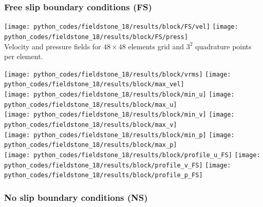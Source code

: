 \subsubsection*{Free slip boundary conditions (FS)}

\begin{center}
\texttt{[image: python\_codes/fieldstone\_18/results/block/FS/vel]}
\texttt{[image: python\_codes/fieldstone\_18/results/block/FS/press]}\\
{\captionfont Velocity and pressure fields for $48\times 48$ elements grid and $3^2$
quadrature points per element.}
\end{center}


\begin{center}
\texttt{[image: python\_codes/fieldstone\_18/results/block/vrms]}
\texttt{[image: python\_codes/fieldstone\_18/results/block/max\_vel]}\\
\texttt{[image: python\_codes/fieldstone\_18/results/block/min\_u]}
\texttt{[image: python\_codes/fieldstone\_18/results/block/max\_u]}\\
\texttt{[image: python\_codes/fieldstone\_18/results/block/min\_v]}
\texttt{[image: python\_codes/fieldstone\_18/results/block/max\_v]}\\
\texttt{[image: python\_codes/fieldstone\_18/results/block/min\_p]}
\texttt{[image: python\_codes/fieldstone\_18/results/block/max\_p]}\\
\texttt{[image: python\_codes/fieldstone\_18/results/block/profile\_u\_FS]}
\texttt{[image: python\_codes/fieldstone\_18/results/block/profile\_v\_FS]}
\texttt{[image: python\_codes/fieldstone\_18/results/block/profile\_p\_FS]}
\end{center}

\subsubsection*{No slip boundary conditions (NS)}

